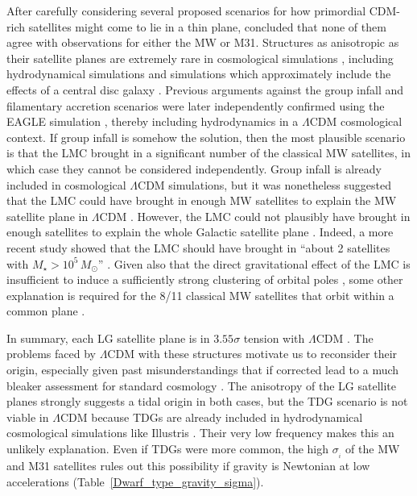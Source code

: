 \documentclass[fleqn,usenatbib,useAMS]{mnras} %
\begin{document}
After carefully considering several proposed scenarios for how primordial CDM-rich satellites might come to lie in a thin plane, \citet{Pawlowski_2014} concluded that none of them agree with observations for either the MW or M31. Structures as anisotropic as their satellite planes are extremely rare in cosmological simulations \citep{Ibata_2014, Pawlowski_2014_paired_halos}, including hydrodynamical simulations \citep{Ahmed_2017, Shao_2019, Pawlowski_2020} and simulations which approximately include the effects of a central disc galaxy \citep{Pawlowski_2019}. Previous arguments against the group infall and filamentary accretion scenarios \citep{Metz_2009, Pawlowski_2014} were later independently confirmed \citep{Shao_2018} using the EAGLE simulation \citep{Crain_2015, Schaye_2015}, thereby including hydrodynamics in a $\Lambda$CDM cosmological context. If group infall is somehow the solution, then the most plausible scenario is that the LMC brought in a significant number of the classical MW satellites, in which case they cannot be considered independently. Group infall is already included in cosmological $\Lambda$CDM simulations, but it was nonetheless suggested that the LMC could have brought in enough MW satellites to explain the MW satellite plane in $\Lambda$CDM \citep{Samuel_2021}. However, the LMC could not plausibly have brought in enough satellites to explain the whole Galactic satellite plane \citep{Nichols_2011}. Indeed, a more recent study showed that the LMC should have brought in ``about 2 satellites with $M_{\star} > 10^5 \, M_\odot$'' \citep{Isabel_2021}. Given also that the direct gravitational effect of the LMC is insufficient to induce a sufficiently strong clustering of orbital poles \citep{Garavito_2021, Correa_2022, Pawlowski_2022}, some other explanation is required for the 8/11 classical MW satellites that orbit within a common plane \citep{Pawlowski_2020}.

In summary, each LG satellite plane is in $3.55\sigma$ tension with $\Lambda$CDM \citep[table~3 of][]{Banik_2021_backsplash}. The problems faced by $\Lambda$CDM with these structures motivate us to reconsider their origin, especially given past misunderstandings that if corrected lead to a much bleaker assessment for standard cosmology \citep{Pawlowski_2021_Nature}. The anisotropy of the LG satellite planes strongly suggests a tidal origin in both cases, but the TDG scenario is not viable in $\Lambda$CDM because TDGs are already included in hydrodynamical cosmological simulations like Illustris \citep{Haslbauer_2019}. Their very low frequency makes this an unlikely explanation. Even if TDGs were more common, the high $\sigma_{_i}$ of the MW and M31 satellites rules out this possibility if gravity is Newtonian at low accelerations (Table~\ref{Dwarf_type_gravity_sigma}).
\end{document}
